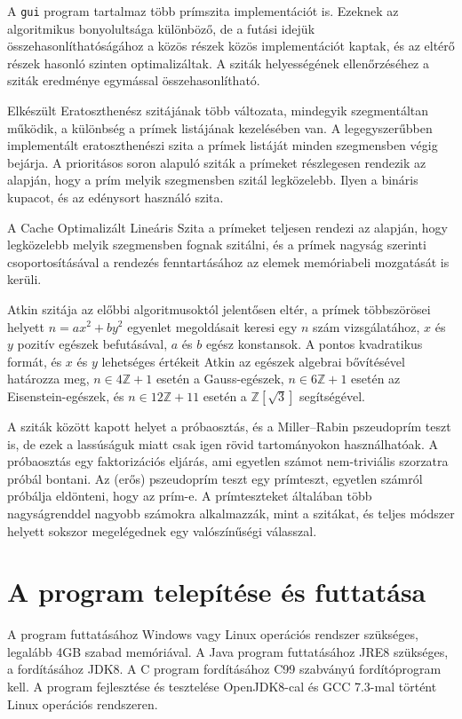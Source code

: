 A \texttt{gui} program tartalmaz több prímszita implementációt is. Ezeknek az algoritmikus bonyolultsága különböző, de a futási idejük összehasonlíthatóságához a közös részek közös implementációt kaptak, és az eltérő részek hasonló szinten optimalizáltak.
A sziták helyességének ellenőrzéséhez a sziták eredménye egymással összehasonlítható.

Elkészült Eratoszthenész szitájának több változata, mindegyik szegmentáltan működik, a különbség a prímek listájának kezelésében van.
A legegyszerűbben implementált eratoszthenészi szita a prímek listáját minden szegmensben végig bejárja.
A prioritásos soron alapuló sziták a prímeket részlegesen rendezik az alapján, hogy a prím melyik szegmensben szitál legközelebb.
Ilyen a bináris kupacot, és az edénysort használó szita.

A Cache Optimalizált Lineáris Szita\cite{cols} a prímeket teljesen rendezi az alapján, hogy legközelebb melyik szegmensben fognak szitálni, és a prímek nagyság szerinti csoportosításával a rendezés fenntartásához az elemek memóriabeli mozgatását is kerüli.

Atkin szitája\cite{atkin} az előbbi algoritmusoktól jelentősen eltér, a prímek többszörösei
helyett $n=ax^2+by^2$ egyenlet megoldásait keresi egy $n$ szám vizsgálatához, $x$ és $y$ pozitív egészek befutásával, $a$ és $b$ egész konstansok.
A pontos kvadratikus formát, és $x$ és $y$ lehetséges értékeit Atkin az egészek algebrai bővítésével határozza meg, $n \in 4\mathbb{Z}+1$ esetén a Gauss-egészek, $n \in 6\mathbb{Z}+1$ esetén az Eisenstein-egészek, és $n \in 12\mathbb{Z}+11$ esetén a $\mathbb{Z}[\sqrt{3}]$ segítségével.

A sziták között kapott helyet a próbaosztás, és a Miller–Rabin pszeudoprím teszt \cite{miller} is, de ezek a lassúságuk miatt csak igen rövid tartományokon használhatóak.
A próbaosztás egy faktorizációs eljárás, ami egyetlen számot nem-triviális szorzatra próbál bontani.
Az (erős) pszeudoprím teszt egy prímteszt, egyetlen számról próbálja eldönteni, hogy az prím-e.
A prímteszteket általában több nagyságrenddel nagyobb számokra alkalmazzák, mint a szitákat, és teljes módszer helyett sokszor megelégednek egy valószínűségi válasszal.

\section{A program telepítése és futtatása}

A program futtatásához Windows vagy Linux operációs rendszer szükséges, legalább 4GB szabad memóriával.
A Java program futtatásához JRE8 szükséges, a fordításához JDK8.
A C program fordításához C99 szabványú fordítóprogram kell.
A program fejlesztése és tesztelése OpenJDK8-cal és GCC 7.3-mal történt Linux operációs rendszeren.

